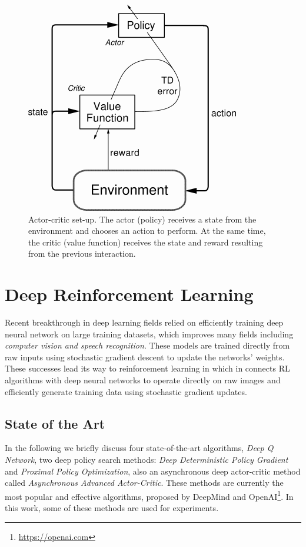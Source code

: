\begin{figure}[!htb]
		\centering
		\includegraphics[width=.3\linewidth]{figures/actor_critic.png}
		\caption{Actor-critic set-up. The actor (policy) receives a state from the environment and chooses an action to perform. At the same time, the critic (value function) receives the state and reward resulting from the previous interaction.~\parencite{arulkumaran2017brief}}
		\label{fig:actor_critic}
\end{figure}



\section{Deep Reinforcement Learning}

Recent breakthrough in deep learning fields relied on efficiently training deep neural network on large training datasets, which improves many fields including \textit{computer vision and speech recognition}. These models are trained directly from raw inputs using stochastic gradient descent to update the networks' weights. These successes lead its way to reinforcement learning in which in connects RL algorithms with deep neural networks to operate directly on raw images and efficiently generate training data using stochastic gradient updates.

\subsection{State of the Art}

In the following we briefly discuss four state-of-the-art algorithms, \textit{Deep Q Network}, two deep policy search methods: \textit{Deep Deterministic Policy Gradient} and \textit{Proximal Policy Optimization}, also an asynchronous deep actor-critic method called \textit{Asynchronous Advanced Actor-Critic}.
These methods are currently the most popular and effective algorithms, proposed by DeepMind and OpenAI\footnote{\url{https://openai.com}}. In this work, some of these methods are used for experiments.

